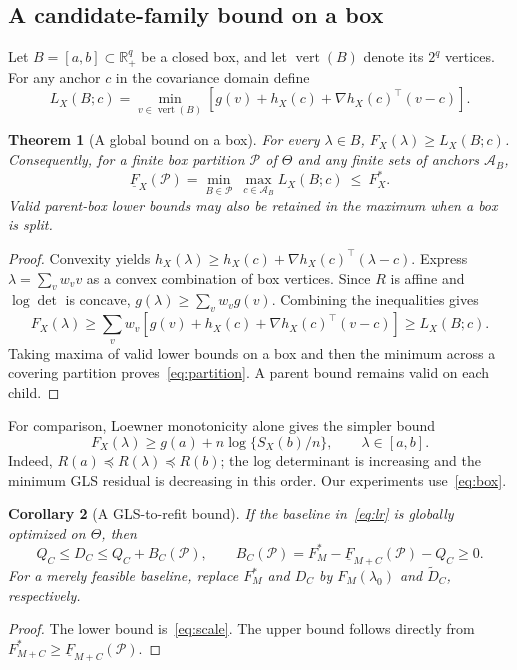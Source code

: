 \documentclass[preprint,11pt,numbers]{elsarticle}
\newtheorem{theorem}{Theorem}
\newtheorem{corollary}[theorem]{Corollary}
\theoremstyle{remark}\newtheorem{remark}[theorem]{Remark}
\newcommand{\R}{\mathbb R}
\newcommand{\vertx}{\operatorname{vert}}
\newcommand{\calP}{\mathcal P}
\begin{document}
\subsection{A candidate-family bound on a box}
Let $B=[a,b]\subset\R_+^q$ be a closed box, and let $\vertx(B)$ denote its $2^q$
vertices. For any anchor $c$ in the covariance domain define
\begin{equation}\label{eq:box}
L_X(B;c)=\min_{v\in\vertx(B)}
\left[g(v)+h_X(c)+\nabla h_X(c)^\top(v-c)\right].
\end{equation}

\begin{theorem}[A global bound on a box]\label{thm:box}
For every $\lambda\in B$, $F_X(\lambda)\geq L_X(B;c)$. Consequently, for a finite
box partition $\calP$ of $\Theta$ and any finite sets of anchors $\mathcal A_B$,
\begin{equation}\label{eq:partition}
\underline F_X(\calP)=\min_{B\in\calP}\ \max_{c\in\mathcal A_B}L_X(B;c)
\ \leq\ F_X^*.
\end{equation}
Valid parent-box lower bounds may also be retained in the maximum when a box is split.
\end{theorem}
\begin{proof}
Convexity yields $h_X(\lambda)\geq h_X(c)+\nabla h_X(c)^\top(\lambda-c)$.
Express $\lambda=\sum_v w_vv$ as a convex combination of box vertices. Since
$R$ is affine and $\log\det$ is concave,
$g(\lambda)\geq\sum_vw_vg(v)$. Combining the inequalities gives
\[
F_X(\lambda)\geq\sum_vw_v\left[g(v)+h_X(c)+\nabla h_X(c)^\top(v-c)\right]
\geq L_X(B;c).
\]
Taking maxima of valid lower bounds on a box and then the minimum across a covering
partition proves~\eqref{eq:partition}. A parent bound remains valid on each child.
\end{proof}

For comparison, Loewner monotonicity alone gives the simpler bound
\begin{equation}\label{eq:loewner}
F_X(\lambda)\geq g(a)+n\log\{S_X(b)/n\},\qquad \lambda\in[a,b].
\end{equation}
Indeed, $R(a)\preceq R(\lambda)\preceq R(b)$; the log determinant is increasing and
the minimum GLS residual is decreasing in this order. Our experiments use~\eqref{eq:box}.

\begin{corollary}[A GLS-to-refit bound]\label{cor:B}
If the baseline in~\eqref{eq:lr} is globally optimized on $\Theta$, then
\begin{equation}\label{eq:BC}
Q_C\leq D_C\leq Q_C+B_C(\calP),\qquad
B_C(\calP)=F_M^*-\underline F_{M+C}(\calP)-Q_C\geq0.
\end{equation}
For a merely feasible baseline, replace $F_M^*$ and $D_C$ by $F_M(\lambda_0)$ and
$\widetilde D_C$, respectively.
\end{corollary}
\begin{proof}
The lower bound is~\eqref{eq:scale}. The upper bound follows directly from
$F_{M+C}^*\geq\underline F_{M+C}(\calP)$.
\end{proof}
\end{document}
